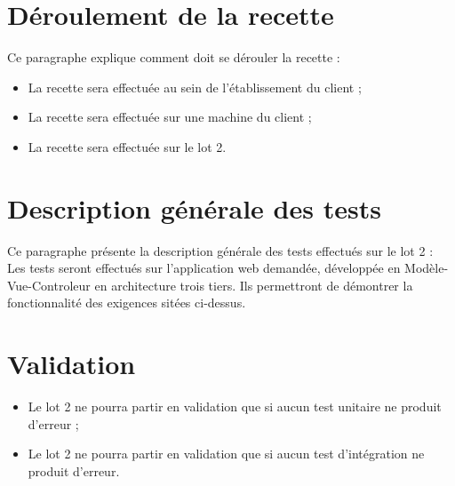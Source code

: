 \section{Déroulement de la recette}
	Ce paragraphe explique comment doit se dérouler la recette : 
	\begin{itemize}
		\item La recette sera effectuée au sein de l'établissement du client \nomClient{} ;
		\item La recette sera effectuée sur une machine du client \nomClient{} ;
		\item La recette sera effectuée sur le lot 2.
	\end{itemize}

\section{Description générale des tests}
	Ce paragraphe présente la description générale des tests effectués sur le lot 2 :	\\
	
	Les tests seront effectués sur l'application web demandée, développée en Modèle-Vue-Controleur en architecture trois tiers. Ils permettront de démontrer la fonctionnalité des exigences sitées ci-dessus.

\section{Validation}	
	\begin{itemize}
		\item Le lot 2 ne pourra partir en validation que si aucun test unitaire ne produit d'erreur ;
		\item Le lot 2 ne pourra partir en validation que si aucun test d’intégration ne produit d'erreur.
	\end{itemize}
	

